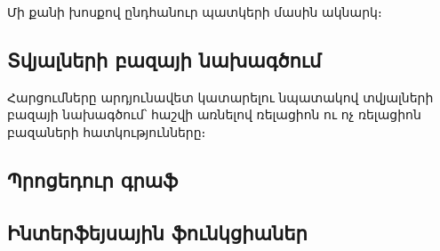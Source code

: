 {
	Մի քանի խոսքով ընդհանուր պատկերի մասին ակնարկ։

	\subsection{Տվյալների բազայի նախագծում}
	Հարցումները արդյունավետ կատարելու նպատակով տվյալների բազայի նախագծում՝ հաշվի առնելով ռելացիոն ու ոչ ռելացիոն բազաների հատկությունները։

	\subsection{Պրոցեդուր գրաֆ}
	

	\subsection{Ինտերֆեյսային ֆունկցիաներ}
}
